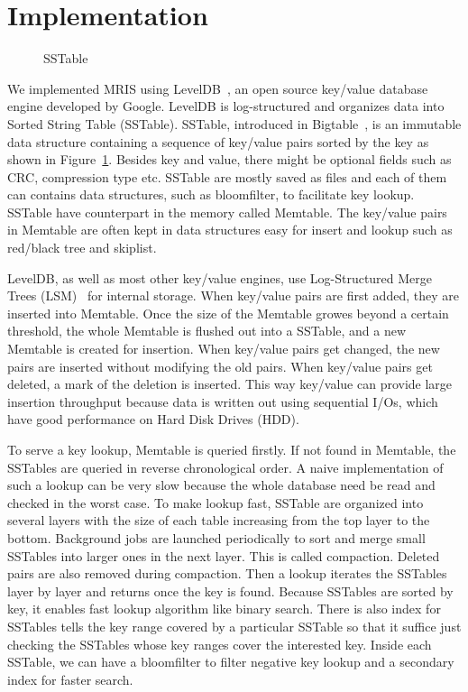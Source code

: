 \section{Implementation}
\label{sec:implementation}

\begin{figure}[t]
\begin{centering}
\caption{SSTable}
\label{fig:sstable}
\end{centering}
\end{figure}


We implemented MRIS using LevelDB~\cite{leveldb-web}, an open source
key/value database engine developed by Google. LevelDB is
log-structured and organizes data into Sorted String Table (SSTable).
SSTable, introduced in Bigtable~\cite{chang06osdi}, is an immutable
data structure containing a sequence of key/value pairs sorted by the
key as shown in Figure~\ref{fig:sstable}. Besides key and value, there
might be optional fields such as CRC, compression type etc. SSTable
are mostly saved as files and each of them can contains data
structures, such as bloomfilter, to facilitate key lookup. SSTable
have counterpart in the memory called Memtable. The key/value pairs in
Memtable are often kept in data structures easy for insert and lookup
such as red/black tree and skiplist.

LevelDB, as well as most other key/value engines, use Log-Structured
Merge Trees (LSM)~\cite{lsm} for internal storage. When key/value
pairs are first added, they are inserted into Memtable.  Once the size
of the Memtable growes beyond a certain threshold, the whole Memtable
is flushed out into a SSTable, and a new Memtable is created for
insertion. When key/value pairs get changed, the new pairs are
inserted without modifying the old pairs. When key/value pairs get
deleted, a mark of the deletion is inserted. This way key/value can
provide large insertion throughput because data is written out using
sequential I/Os, which have good performance on Hard Disk Drives
(HDD). 

To serve a key lookup, Memtable is queried firstly. If not found in
Memtable, the SSTables are queried in reverse chronological order. A
naive implementation of such a lookup can be very slow because the
whole database need be read and checked in the worst case. To make
lookup fast, SSTable are organized into several layers with the size
of each table increasing from the top layer to the bottom. Background
jobs are launched periodically to sort and merge small SSTables into
larger ones in the next layer. This is called compaction. Deleted
pairs are also removed during compaction. Then a lookup iterates the
SSTables layer by layer and returns once the key is found.  Because
SSTables are sorted by key, it enables fast lookup algorithm like
binary search. There is also index for SSTables tells the key range
covered by a particular SSTable so that it suffice just checking the
SSTables whose key ranges cover the interested key. Inside each
SSTable, we can have a bloomfilter to filter negative key lookup and a
secondary index for faster search.

